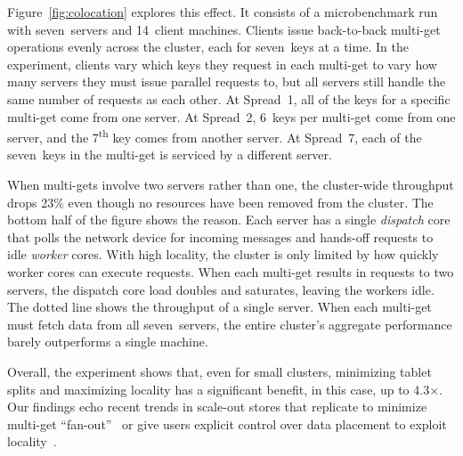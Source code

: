Figure~\ref{fig:colocation} explores this effect. It consists of a
microbenchmark run with seven~servers and 14~client machines. Clients issue back-to-back
multi-get operations evenly across the cluster, each for seven~keys at a time. In
the experiment, clients vary which keys they request in each multi-get to vary
how many servers they must issue parallel requests to, but all servers still
handle the same number of requests as each other.
At Spread~1, all of the keys for a specific multi-get come from one server. At
Spread~2, 6~keys per multi-get come from one server, and the
7\textsuperscript{th} key comes from another server. At Spread~7, each of the
seven~keys in the multi-get is serviced by a different server.

When multi-gets involve two servers rather than one, the cluster-wide throughput
drops 23\% even though no resources have been removed from the cluster. The
bottom half of the figure shows the reason.  Each server has a single {\em dispatch}
core that polls the network device for incoming messages and hands-off requests
to idle {\em worker} cores.  With high locality, the cluster is only limited by
how quickly worker cores can execute requests. When each multi-get results in
requests to two servers, the dispatch core load doubles and saturates, leaving
the workers idle. The dotted line shows the throughput of a single server.
When each multi-get must fetch data from all seven~servers, the entire
cluster's aggregate performance barely outperforms a single machine.

Overall, the experiment shows that, even for small clusters, minimizing tablet
splits and maximizing locality has a significant benefit, in this case, up to
4.3$\times$.  Our findings echo recent trends in scale-out stores that
replicate to minimize multi-get ``fan-out''~\cite{fb-memcache} or give users
explicit control over data placement to exploit locality~\cite{spanner}.

